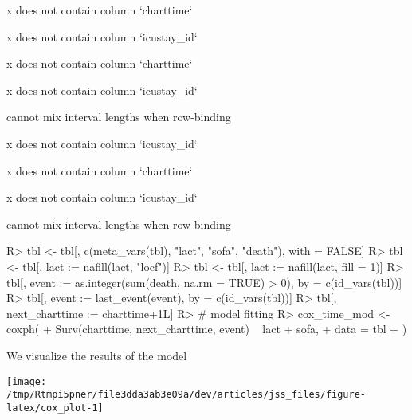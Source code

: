 \documentclass[
]{jss}
\begin{document}
\begin{CodeChunk}
\begin{CodeOutput}
x does not contain column `charttime`
\end{CodeOutput}

\begin{CodeOutput}
x does not contain column `icustay_id`
\end{CodeOutput}

\begin{CodeOutput}
x does not contain column `charttime`
\end{CodeOutput}

\begin{CodeOutput}
x does not contain column `icustay_id`
\end{CodeOutput}

\begin{CodeOutput}
cannot mix interval lengths when row-binding
\end{CodeOutput}

\begin{CodeOutput}
x does not contain column `icustay_id`
\end{CodeOutput}

\begin{CodeOutput}
x does not contain column `charttime`
\end{CodeOutput}

\begin{CodeOutput}
x does not contain column `icustay_id`
\end{CodeOutput}

\begin{CodeOutput}
cannot mix interval lengths when row-binding
\end{CodeOutput}

\begin{CodeInput}
R> tbl <- tbl[, c(meta_vars(tbl), "lact", "sofa", "death"), with = FALSE]
R> tbl <- tbl[, lact := nafill(lact, "locf")]
R> tbl <- tbl[, lact := nafill(lact, fill = 1)]
R> tbl[, event := as.integer(sum(death, na.rm = TRUE) > 0), by = c(id_vars(tbl))]
R> tbl[, event := last_event(event), by = c(id_vars(tbl))]
R> tbl[, next_charttime := charttime+1L]
R> # model fitting
R> cox_time_mod <- coxph(
+   Surv(charttime, next_charttime, event) ~ lact + sofa,
+   data = tbl
+ )
\end{CodeInput}
\end{CodeChunk}

We visualize the results of the model

\begin{CodeChunk}


\begin{center}\texttt{[image: /tmp/Rtmpi5pner/file3dda3ab3e09a/dev/articles/jss\_files/figure-latex/cox\_plot-1]} \end{center}

\end{CodeChunk}
\end{document}
